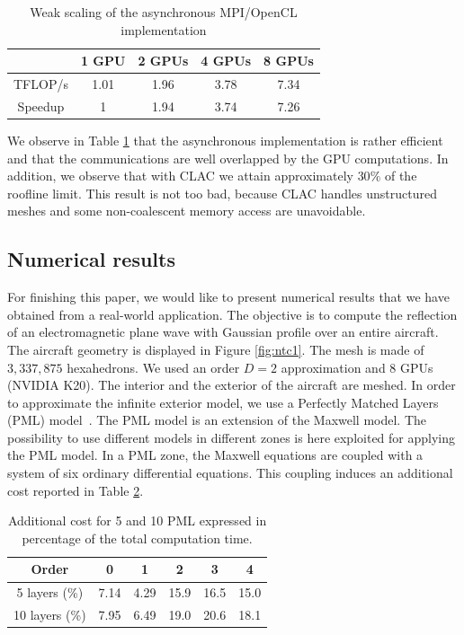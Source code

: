 \documentclass[12pt]{amsart}
\begin{document}
\begin{table}[htdp]
\begin{center}
\begin{tabular}{|c|c|c|c|c|}
\hline
 & 1 GPU & 2 GPUs & 4 GPUs & 8 GPUs\tabularnewline
\hline
\hline
TFLOP/s & 1.01 & 1.96 & 3.78 & 7.34\tabularnewline
\hline
Speedup & 1 & 1.94 & 3.74 & 7.26\tabularnewline
\hline
\end{tabular}
\end{center}
\caption{Weak scaling of the asynchronous MPI/OpenCL implementation \label{tab:async-perfs}}
\end{table}%


We observe in Table \ref{tab:async-perfs} that the asynchronous implementation is rather efficient and that the communications are well overlapped by the GPU computations. In addition, we observe that with CLAC we attain approximately $30\%$ of the roofline limit. This result is not too bad, because CLAC handles unstructured meshes and some non-coalescent memory access are unavoidable.


\subsection{Numerical results}


For finishing this paper, we would like to present numerical results that we have obtained from a real-world application. The objective is to compute the reflection of an electromagnetic plane wave with Gaussian profile over an entire aircraft.  The aircraft geometry is displayed in Figure \ref{fig:ntc1}. The mesh is made of $3,337,875$ hexahedrons. We used an order $D=2$ approximation and 8 GPUs (NVIDIA K20). The interior and the exterior of the aircraft are meshed. In order to approximate the infinite exterior model, we use a Perfectly Matched Layers (PML) model~\cite{berenger}. The PML model is an extension of the Maxwell model. The possibility to use different models in different zones is here exploited for applying the PML model. In a PML
zone, the Maxwell equations are coupled with a system of six ordinary
differential equations. This coupling induces an additional cost reported
in Table \ref{tab:cost_pml}.


\begin{table}[h]
  \centering
  \begin{tabular}[h]{|c||c|c|c|c|c|}
    \hline
             Order &    0 &    1 &    2 &    3 &    4 \\ \hline
     5 layers (\%) & 7.14 & 4.29 & 15.9 & 16.5 & 15.0 \\ \hline
    10 layers (\%) & 7.95 & 6.49 & 19.0 & 20.6 & 18.1 \\ \hline
  \end{tabular}
  \caption{Additional cost for 5 and 10 PML expressed in percentage of the
    total computation time.}
  \label{tab:cost_pml}
\end{table}
\end{document}

